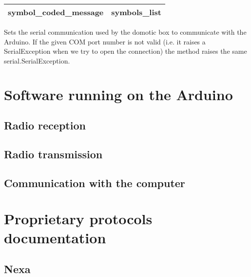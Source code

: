 \documentclass[letterpaper,10pt,english]{sphinxmanual}
\begin{document}
\begin{fulllineitems}
\begin{fulllineitems}
\begin{tabulary}{\linewidth}{|L|L|}
symbol\_coded\_message
 & 
symbols\_list
\\
\hline\end{tabulary}


\end{fulllineitems}


\begin{fulllineitems}
\label{implementation_examples:drivers.arduino_radio.ArduinoRadio.set}
Sets the serial communication used by the domotic 
box to communicate with the Arduino. If the given COM
port number is not valid (i.e. it raises a SerialException
when we try to open the connection) the method raises 
the same serial.SerialException.

\end{fulllineitems}


\end{fulllineitems}



\chapter{Software running on the Arduino}
\label{arduino::doc}\label{arduino:software-running-on-the-arduino}

\section{Radio reception}
\label{arduino:radio-reception}

\section{Radio transmission}
\label{arduino:radio-transmission}

\section{Communication with the computer}
\label{arduino:communication-with-the-computer}

\chapter{Proprietary protocols documentation}
\label{proprietary_protocols::doc}\label{proprietary_protocols:proprietary-protocols-documentation}

\section{Nexa}
\label{proprietary_protocols:nexa}
\end{document}
